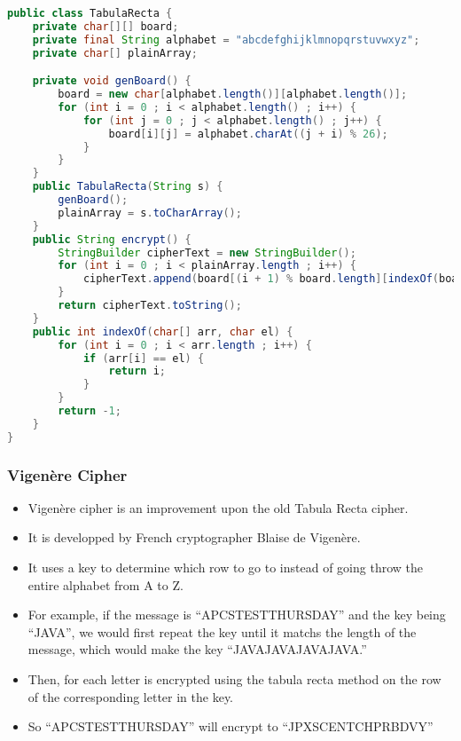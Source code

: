 \documentclass{beamer}
\begin{document}
\begin{frame}[fragile]
\begin{lstlisting}[language=java]
public class TabulaRecta {
    private char[][] board;
    private final String alphabet = "abcdefghijklmnopqrstuvwxyz";
    private char[] plainArray;

    private void genBoard() {
        board = new char[alphabet.length()][alphabet.length()];
        for (int i = 0 ; i < alphabet.length() ; i++) {
            for (int j = 0 ; j < alphabet.length() ; j++) {
                board[i][j] = alphabet.charAt((j + i) % 26);
            }
        }
    }
    public TabulaRecta(String s) {
        genBoard();
        plainArray = s.toCharArray();
    }
    public String encrypt() {
        StringBuilder cipherText = new StringBuilder();
        for (int i = 0 ; i < plainArray.length ; i++) {
            cipherText.append(board[(i + 1) % board.length][indexOf(board[0], plainArray[i])]);
        }
        return cipherText.toString();
    }
    public int indexOf(char[] arr, char el) {
        for (int i = 0 ; i < arr.length ; i++) {
            if (arr[i] == el) {
                return i;
            }
        }
        return -1;
    }
}
\end{lstlisting}
\end{frame}

\begin{frame}
\frametitle{Vigenère Cipher}
    \begin{itemize}
        \item Vigenère cipher is an improvement upon the old Tabula Recta
            cipher.
        \item It is developped by French cryptographer Blaise de Vigenère.
        \item It uses a key to determine which row to go to instead of going
            throw the entire alphabet from A to Z.
        \item For example, if the message is ``APCSTESTTHURSDAY'' and the key
            being ``JAVA'', we would first repeat the key until it matchs the
            length of the message, which would make the key ``JAVAJAVAJAVAJAVA.''
        \item Then, for each letter is encrypted using the tabula recta method
            on the row of the corresponding letter in the key.
        \item So ``APCSTESTTHURSDAY'' will encrypt to ``JPXSCENTCHPRBDVY''
    \end{itemize}
\end{frame}
\end{document}
